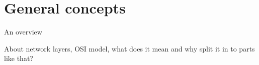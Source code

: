 \chapter{General concepts}
An overview

About network layers, OSI model, what does it mean and why split it in to parts like that?
